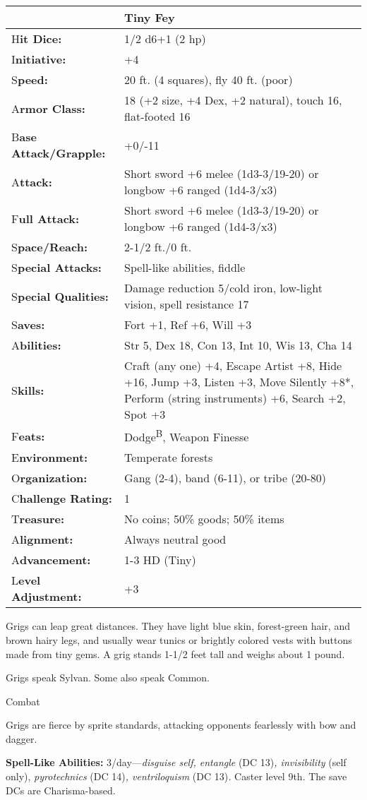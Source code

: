 \documentclass{article}
\begin{document}
\begin{tabular}{|>{\raggedright}p{78pt}|>{\raggedright}p{247pt}|}
\hline
  & Tiny Fey\tabularnewline
\hline
H\textbf{it Dice:} & 1/2 d6+1 (2 hp)\tabularnewline
\hline
I\textbf{nitiative:} & +4\tabularnewline
\hline
S\textbf{peed:} & 20 ft. (4 squares), fly 40 ft. (poor)\tabularnewline
\hline
A\textbf{rmor Class:} & 18 (+2 size, +4 Dex, +2 natural), touch 16, flat-footed 
16\tabularnewline
\hline
B\textbf{ase Attack/Grapple:} & +0/-11\tabularnewline
\hline
A\textbf{ttack:} & Short sword +6 melee (1d3-3/19-20) or longbow +6 ranged (1d4-3/x3)\tabularnewline
\hline
F\textbf{ull Attack:} & Short sword +6 melee (1d3-3/19-20) or longbow +6 ranged 
(1d4-3/x3)\tabularnewline
\hline
S\textbf{pace/Reach:} & 2-1/2 ft./0 ft.\tabularnewline
\hline
S\textbf{pecial Attacks:} & Spell-like abilities, fiddle\tabularnewline
\hline
S\textbf{pecial Qualities:} & Damage reduction 5/cold iron, low-light vision, spell 
resistance 17\tabularnewline
\hline
S\textbf{aves:} & Fort +1, Ref +6, Will +3\tabularnewline
\hline
A\textbf{bilities:} & Str 5, Dex 18, Con 13, Int 10, Wis 13, Cha 14\tabularnewline
\hline
S\textbf{kills:} & Craft (any one) +4, Escape Artist +8, Hide +16, Jump +3, Listen 
+3, Move Silently +8*, Perform (string instruments) +6, Search +2, Spot +3\tabularnewline
\hline
F\textbf{eats:} & Dodge\textsuperscript{B}, Weapon Finesse\tabularnewline
\hline
E\textbf{nvironment:} & Temperate forests\tabularnewline
\hline
O\textbf{rganization:} & Gang (2-4), band (6-11), or tribe (20-80)\tabularnewline
\hline
C\textbf{hallenge Rating:} & 1\tabularnewline
\hline
T\textbf{reasure:} & No coins; 50\% goods; 50\% items\tabularnewline
\hline
A\textbf{lignment:} & Always neutral good\tabularnewline
\hline
A\textbf{dvancement:} & 1-3 HD (Tiny)\tabularnewline
\hline
L\textbf{evel Adjustment:} & +3\tabularnewline
\hline
\end{tabular}

Grigs can leap great distances. They have light blue skin, forest-green hair, and 
brown hairy legs, and usually wear tunics or brightly colored vests with buttons 
made from tiny gems. A grig stands 1-1/2 feet tall and weighs about 1 pound. 

Grigs speak Sylvan. Some also speak Common.

Combat

Grigs are fierce by sprite standards, attacking opponents fearlessly with bow and 
dagger.

\textbf{Spell-Like Abilities:} 3/day---\textit{disguise self, entangle }(DC 13)\textit{, 
invisibility }(self only), \textit{pyrotechnics }(DC 14)\textit{, ventriloquism 
}(DC 13)\textit{. }Caster level 9th. The save DCs are Charisma-based.
\end{document}
